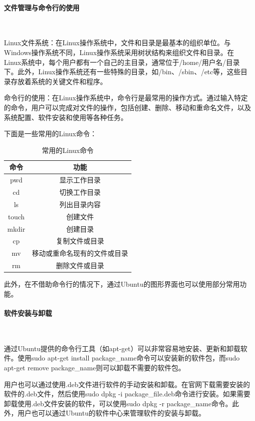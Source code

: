 \documentclass[UTF8]{article}
\begin{document}
\paragraph{文件管理与命令行的使用}~{}

Linux文件系统：在Linux操作系统中，文件和目录是最基本的组织单位。与Windows操作系统不同，Linux操作系统采用树状结构来组织文件和目录。在Linux系统中，每个用户都有一个自己的主目录，通常位于/home/用户名/目录下。此外，Linux操作系统还有一些特殊的目录，如/bin、/sbin、/etc等，这些目录存放着系统的关键文件和程序。

命令行的使用：在Linux操作系统中，命令行是最常用的操作方式。通过输入特定的命令，用户可以完成对文件的操作，包括创建、删除、移动和重命名文件，以及系统配置、软件安装和使用等各种任务。

下面是一些常用的Linux命令：

\begin{table}[H] %
\centering %
\begin{tabular}{cc} %
	\toprule %
	命令 & 功能 \\
	\midrule %
	pwd & 显示工作目录 \\
    cd & 切换工作目录 \\
    ls & 列出目录内容 \\
    touch & 创建文件 \\
    mkdir & 创建目录 \\
    cp & 复制文件或目录 \\
    mv & 移动或重命名现有的文件或目录 \\
    rm & 删除文件或目录 \\
	\bottomrule %
\end{tabular}
\caption{常用的Linux命令} %
\end{table} 

此外，在不借助命令行的情况下，通过Ubuntu的图形界面也可以使用部分常用功能。

\paragraph{软件安装与卸载}~{}

通过Ubuntu提供的命令行工具（如apt-get）可以非常容易地安装、更新和卸载软件。使用sudo apt-get install package\_name命令可以安装新的软件包，而sudo apt-get remove package\_name则可以卸载不需要的软件包。

用户也可以通过使用.deb文件进行软件的手动安装和卸载。在官网下载需要安装的软件的.deb文件，然后使用sudo dpkg -i package\_file.deb命令进行安装。如果需要卸载使用.deb文件安装的软件，可以使用sudo dpkg -r package\_name命令。此外，用户也可以通过Ubuntu的软件中心来管理软件的安装与卸载。
\end{document}
